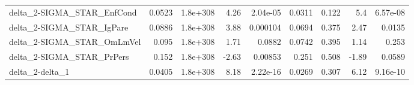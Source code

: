\begin{tabular}{lrrrrrrrr}
delta\_2-SIGMA\_STAR\_EnfCond            &      0.0523 &     1.8e+308 &    4.26 & 2.04e-05 &     0.0311 &       0.122 &          5.4 &      6.57e-08 \\
delta\_2-SIGMA\_STAR\_IgPare             &      0.0886 &     1.8e+308 &    3.88 & 0.000104 &     0.0694 &       0.375 &         2.47 &        0.0135 \\
delta\_2-SIGMA\_STAR\_OmLmVel            &       0.095 &     1.8e+308 &    1.71 &   0.0882 &     0.0742 &       0.395 &         1.14 &         0.253 \\
delta\_2-SIGMA\_STAR\_PrPers             &       0.152 &     1.8e+308 &   -2.63 &  0.00853 &      0.251 &       0.508 &        -1.89 &        0.0589 \\
delta\_2-delta\_1                       &      0.0405 &     1.8e+308 &    8.18 & 2.22e-16 &     0.0269 &       0.307 &         6.12 &      9.16e-10 \\
\bottomrule
\end{tabular}
